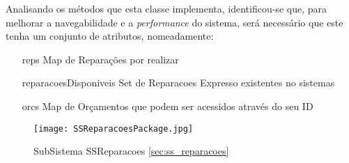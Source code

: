 \documentclass[../../relatorio.tex]{subfiles}
\begin{document}
Analisando os métodos que esta classe implementa, identificou-se que, para melhorar a navegabilidade
e a \textit{performance} do sistema, será necessário que este tenha um conjunto de atributos, nomeadamente:
\begin{itemize}
    \item [reps]{Map de Reparações por realizar}
    \item [reparacoesDisponiveis]{Set de Reparacoes Expresso existentes no sistemas}
    \item [orcs]{Map de Orçamentos que podem ser acessidos através do seu ID}
\end{itemize}

\begin{figure}[!ht]
    \centering
    \texttt{[image: SSReparacoesPackage.jpg]}
    \caption{SubSistema SSReparacoes \ref{sec:ss_reparacoes}}
\end{figure}
\end{document}
